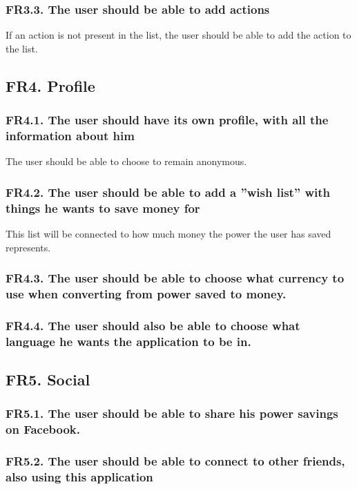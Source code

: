 \subsubsection{FR3.3. The user should be able to add actions}
If an action is not present in the list, the user should be able to add the action to the list.



\subsection{FR4. Profile}

\subsubsection{FR4.1. The user should have its own profile, with all the information about him}
The user should be able to choose to remain anonymous.

\subsubsection{FR4.2. The user should be able to add a ''wish list'' with things he wants to save money for}
This list will be connected to how much money the power the user has saved represents.

\subsubsection{FR4.3. The user should be able to choose what currency to use when converting from power saved to money.}

\subsubsection{FR4.4. The user should also be able to choose what language he wants the application to be in.}


\subsection{FR5. Social}
\subsubsection{FR5.1. The user should be able to share his power savings on Facebook.}

\subsubsection{FR5.2. The user should be able to connect to other friends, also using this application}

